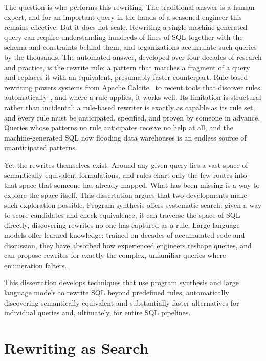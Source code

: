 The question is who performs this rewriting. The traditional answer is a
human expert, and for an important query in the hands of a seasoned
engineer this remains effective. But it does not scale. Rewriting a
single machine-generated query can require understanding hundreds of
lines of SQL together with the schema and constraints behind them, and
organizations accumulate such queries by the thousands. The automated
answer, developed over four decades of research and practice, is the
rewrite rule: a pattern that matches a fragment of a query and replaces
it with an equivalent, presumably faster counterpart. Rule-based
rewriting powers systems from Apache Calcite~\cite{begoli2018apache} to
recent tools that discover rules automatically~\cite{wetune}, and where
a rule applies, it works well. Its limitation is structural rather than
incidental: a rule-based rewriter is exactly as capable as its rule set,
and every rule must be anticipated, specified, and proven by someone in
advance. Queries whose patterns no rule anticipates receive no help at
all, and the machine-generated SQL now flooding data warehouses is an
endless source of unanticipated patterns.

Yet the rewrites themselves exist. Around any given query lies a vast
space of semantically equivalent formulations, and rules chart only the
few routes into that space that someone has already mapped. What has
been missing is a way to explore the space itself. This dissertation
argues that two developments make such exploration possible. Program
synthesis offers systematic search: given a way to score candidates and
check equivalence, it can traverse the space of SQL directly,
discovering rewrites no one has captured as a rule. Large language
models offer learned knowledge: trained on decades of accumulated code
and discussion, they have absorbed how experienced engineers reshape
queries, and can propose rewrites for exactly the complex, unfamiliar
queries where enumeration falters.

This dissertation develops techniques that use program synthesis and
large language models to rewrite SQL beyond predefined rules,
automatically discovering semantically equivalent and substantially
faster alternatives for individual queries and, ultimately, for entire
SQL pipelines.

\section{Rewriting as Search}
\label{sec:intro:search}

